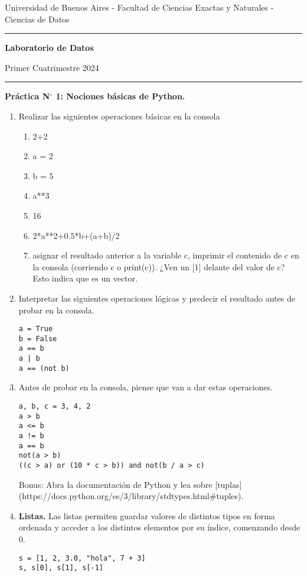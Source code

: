 \documentclass[a4paper,11pt]{article}
\theoremstyle{definition}
\begin{document}
\centerline{{\small Universidad de Buenos Aires - Facultad de Ciencias Exactas y Naturales - Ciencias de Datos}}

\vskip 0.2cm

\hrule

\vskip 0.2cm

 \centerline{{\bf\Large{\sc Laboratorio de Datos}}}

 \vskip 0.2cm

 \centerline{\ttfamily Primer Cuatrimestre 2024}

\vskip 0.2cm

 \hrule

 \bigskip
 \centerline{\bf Práctica N$^\circ$ 1: Nociones básicas de Python.}
 \bigskip

\begin{enumerate}
\item
Realizar las siguientes operaciones básicas en la consola
\begin{enumerate}
\item 2+2
\item a = 2
\item b = 5
\item a**3
\item 16 %
\item 2*a**2+0.5*b+(a+b)/2
\item asignar el resultado anterior a la variable c, imprimir el contenido de c en la consola (corriendo c o print(c)). ¿Ven un [1] delante del valor de c? Esto indica que es un vector.
\end{enumerate}

\item Interpretar las siguientes operaciones lógicas y predecir el resultado antes de probar en la consola.
\begin{lstlisting}
a = True
b = False
a == b
a | b
a == (not b)
\end{lstlisting}

\item Antes de probar en la consola, piense que van a dar estas operaciones.
\begin{lstlisting}
a, b, c = 3, 4, 2
a > b
a <= b
a != b
a == b
not(a > b)
((c > a) or (10 * c > b)) and not(b / a > c)
\end{lstlisting}
Bonus: Abra la documentación de Python y lea sobre [tuplas](https://docs.python.org/es/3/library/stdtypes.html#tuples).

\item \textbf{Listas.}
Las listas permiten guardar valores de distintos tipos en forma ordenada y acceder a los distintos elementos por su índice, comenzando desde 0.
\begin{lstlisting}
s = [1, 2, 3.0, "hola", 7 + 3]
s, s[0], s[1], s[-1]
\end{lstlisting}



\end{enumerate}
\end{document}
